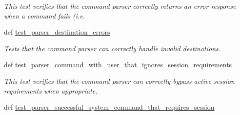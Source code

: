 \begin{DoxyCompactItemize}
\begin{DoxyCompactList}\small\item\em This test verifies that the command parser correctly returns an error response when a command fails (i.\-e. \end{DoxyCompactList}\item 
\hypertarget{classhwm_1_1command_1_1tests_1_1test__command__infrastructure_1_1_test_command_infrastructure_a690927aeab77a1a6440250ed54024852}{def \hyperlink{classhwm_1_1command_1_1tests_1_1test__command__infrastructure_1_1_test_command_infrastructure_a690927aeab77a1a6440250ed54024852}{test\-\_\-parser\-\_\-destination\-\_\-errors}}\label{classhwm_1_1command_1_1tests_1_1test__command__infrastructure_1_1_test_command_infrastructure_a690927aeab77a1a6440250ed54024852}

\begin{DoxyCompactList}\small\item\em Tests that the command parser can correctly handle invalid destinations. \end{DoxyCompactList}\item 
\hypertarget{classhwm_1_1command_1_1tests_1_1test__command__infrastructure_1_1_test_command_infrastructure_a2ce195da923e1e91ff7b624e4965bcc6}{def \hyperlink{classhwm_1_1command_1_1tests_1_1test__command__infrastructure_1_1_test_command_infrastructure_a2ce195da923e1e91ff7b624e4965bcc6}{test\-\_\-parser\-\_\-command\-\_\-with\-\_\-user\-\_\-that\-\_\-ignores\-\_\-session\-\_\-requirements}}\label{classhwm_1_1command_1_1tests_1_1test__command__infrastructure_1_1_test_command_infrastructure_a2ce195da923e1e91ff7b624e4965bcc6}

\begin{DoxyCompactList}\small\item\em This test verifies that the command parser can correctly bypass active session requirements when appropriate. \end{DoxyCompactList}\item 
\hypertarget{classhwm_1_1command_1_1tests_1_1test__command__infrastructure_1_1_test_command_infrastructure_a91918c414b530da27277837b7750e593}{def \hyperlink{classhwm_1_1command_1_1tests_1_1test__command__infrastructure_1_1_test_command_infrastructure_a91918c414b530da27277837b7750e593}{test\-\_\-parser\-\_\-successful\-\_\-system\-\_\-command\-\_\-that\-\_\-requires\-\_\-session}}\label{classhwm_1_1command_1_1tests_1_1test__command__infrastructure_1_1_test_command_infrastructure_a91918c414b530da27277837b7750e593}


\end{DoxyCompactItemize}
